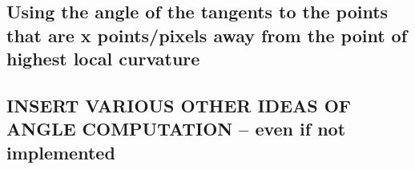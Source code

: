 \subsection{Using the angle of the tangents to the points that are x points/pixels away from the point of highest local curvature}

\subsection{INSERT VARIOUS OTHER IDEAS OF ANGLE COMPUTATION -- even if not implemented}
